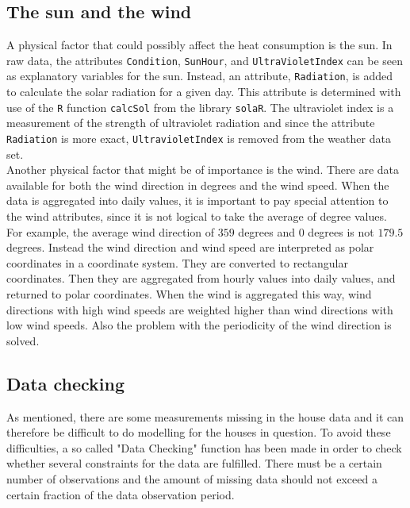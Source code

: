 \subsection{The sun and the wind}
\noindent A physical factor that could possibly affect the heat consumption is the sun. In raw data, the attributes \texttt{Condition}, \texttt{SunHour},  and \texttt{UltraVioletIndex} can be seen as explanatory variables for the sun. Instead, an attribute, \texttt{Radiation}, is added to calculate the solar radiation for a given day. This attribute is determined with use of the \texttt{R} function \texttt{calcSol} from the library \texttt{solaR}. The ultraviolet index is a measurement of the strength of ultraviolet radiation and since the attribute \texttt{Radiation} is more exact, \texttt{UltravioletIndex} is removed from the weather data set. \\

\noindent Another physical factor that might be of importance is the wind. There are data available for both the wind direction in degrees and the wind speed. When the data is aggregated into daily values, it is important to pay special attention to the wind attributes, since it is not logical to take the average of degree values. For example, the average wind direction of $359$ degrees and $0$ degrees is not $179.5$ degrees. Instead the wind direction and wind speed are interpreted as polar coordinates in a coordinate system. They are converted to rectangular coordinates. Then they are aggregated from hourly values into daily values, and returned to polar coordinates.  When the wind is aggregated this way, wind directions with high wind speeds are weighted higher than wind directions with low wind speeds. Also the problem with the periodicity of the wind direction is solved.


\subsection{Data checking}
As mentioned, there are some measurements missing in the house data and it can therefore be difficult to do modelling for the houses in question. To avoid these difficulties, a so called "Data Checking" function has been made in order to check whether several constraints for the data are fulfilled. There must be a certain number of observations and the amount of missing data should not exceed a certain fraction of the data observation period.